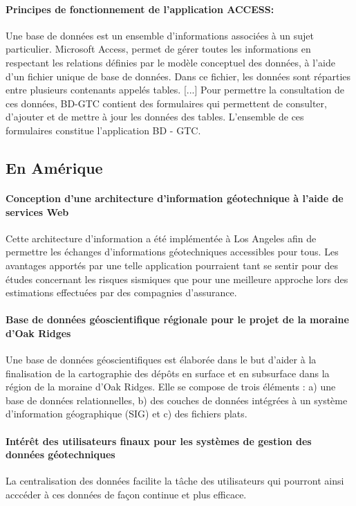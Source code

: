        \paragraph{ Principes de fonctionnement de l'application ACCESS: }
       Une base de données est un ensemble d'informations associées à un sujet particulier.
        Microsoft Access, permet de gérer toutes les informations en respectant les relations définies
        par le modèle conceptuel des données, à l'aide d'un fichier unique de base de données. Dans
        ce fichier, les données sont réparties entre plusieurs contenants appelés tables. [...]
        Pour permettre la consultation de ces données, BD-GTC contient des formulaires qui
        permettent de consulter, d'ajouter et de mettre à jour les données des tables. L'ensemble de ces
        formulaires constitue l'application BD - GTC.
        \cite{Cayenne}

        \subsection{En Amérique}
        \paragraph{Conception d'une architecture d'information géotechnique à l'aide de services Web}
        Cette architecture d'information a été implémentée à Los Angeles afin de permettre les échanges 
        d'informations géotechniques accessibles pour tous. Les avantages apportés par une telle 
        application pourraient tant se sentir pour des études concernant les risques sismiques que pour 
        une meilleure approche lors des estimations effectuées par des compagnies d'assurance. 
        \cite{zimmermann2003design}
        \paragraph{Base de données géoscientifique régionale pour le projet de la moraine d'Oak Ridges}
        Une base de données géoscientifiques est élaborée dans le but d’aider à la finalisation de la 
        cartographie des dépôts en surface et en subsurface dans la région de la moraine d’Oak 
        Ridges. Elle se compose de trois éléments : a) une base de données relationnelles, 
        b) des couches de données intégrées à un système d’information géographique (SIG) 
        et c) des fichiers plats.
        \cite{russell1996regional}
        \paragraph{Intérêt des utilisateurs finaux pour les systèmes de gestion des données géotechniques}
        La centralisation des données facilite la tâche des utilisateurs qui pourront ainsi acccéder à ces
        données de façon continue et plus efficace.
        \cite{Turner2008}

